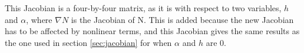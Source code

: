 \noindent This Jacobian is a four-by-four matrix, as it is with respect to two variables, $h$ and $\alpha$, where $\nabla N$ is the Jacobian of N. This is added because the new Jacobian has to be affected by nonlinear terms, and this Jacobian gives the same results as the one used in section \ref{sec:jacobian} for when $\alpha$ and $h$ are 0. 



